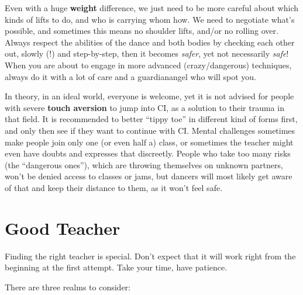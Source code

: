 Even with a huge \textbf{weight} difference, we just need to be more careful about which kinds of lifts to do, and who is carrying whom how.
We need to negotiate what's possible, and sometimes this means no shoulder lifts, and/or no rolling over.
Always respect the abilities of the dance and both bodies by checking each other out, slowly (!) and step-by-step, then it becomes \textit{safer}, yet not necessarily \textit{safe}!
When you are about to engage in more advanced (crazy/dangerous) techniques, always do it with a lot of care and a \gls{guardianangel} who will spot you.

In theory, in an ideal world, everyone is welcome, yet it is not advised for people with severe \textbf{touch aversion} to jump into CI, as a solution to their trauma in that field.
It is recommended to better ``tippy toe'' in different kind of forms first, and only then see if they want to continue with CI\@.
Mental challenges sometimes make people join only one (or even half a) class, or sometimes the teacher might even have doubts and expresses that discreetly.
People who take too many risks (the ``dangerous ones''), which are throwing themselves on unknown partners, won't be denied access to classes or jams, but dancers will most likely get aware of that and keep their distance to them, as it won't feel safe.

\section{Good Teacher}\label{sec:good-teacher}

Finding the right teacher is special.
Don’t expect that it will work right from the beginning at the first attempt.
Take your time, have patience.

There are three realms to consider:

